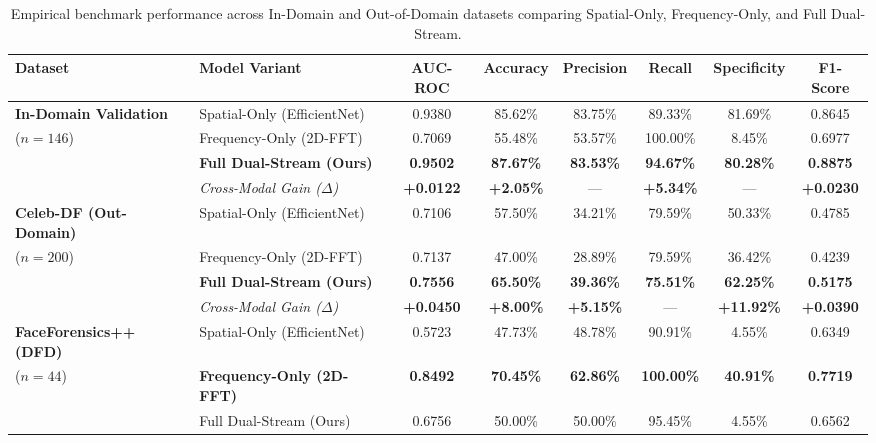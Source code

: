 \documentclass[journal,10pt,twocolumn]{article}
\begin{document}
\begin{table}[t]
\centering
\caption{Empirical benchmark performance across In-Domain and Out-of-Domain datasets comparing Spatial-Only, Frequency-Only, and Full Dual-Stream.}
\label{tab:ablation}
\small
\begin{tabular}{llcccccc}
\toprule
\textbf{Dataset} & \textbf{Model Variant} & \textbf{AUC-ROC} & \textbf{Accuracy} & \textbf{Precision} & \textbf{Recall} & \textbf{Specificity} & \textbf{F1-Score} \\
\midrule
\textbf{In-Domain Validation} & Spatial-Only (EfficientNet) & 0.9380 & 85.62\% & 83.75\% & 89.33\% & 81.69\% & 0.8645 \\
($n=146$)                     & Frequency-Only (2D-FFT)    & 0.7069 & 55.48\% & 53.57\% & 100.00\% & 8.45\% & 0.6977 \\
                              & \textbf{Full Dual-Stream (Ours)} & \textbf{0.9502} & \textbf{87.67\%} & \textbf{83.53\%} & \textbf{94.67\%} & \textbf{80.28\%} & \textbf{0.8875} \\
                              & \textit{Cross-Modal Gain ($\Delta$)} & \textbf{+0.0122} & \textbf{+2.05\%} & --- & \textbf{+5.34\%} & --- & \textbf{+0.0230} \\
\midrule
\textbf{Celeb-DF (Out-Domain)} & Spatial-Only (EfficientNet) & 0.7106 & 57.50\% & 34.21\% & 79.59\% & 50.33\% & 0.4785 \\
($n=200$)                      & Frequency-Only (2D-FFT)    & 0.7137 & 47.00\% & 28.89\% & 79.59\% & 36.42\% & 0.4239 \\
                               & \textbf{Full Dual-Stream (Ours)} & \textbf{0.7556} & \textbf{65.50\%} & \textbf{39.36\%} & \textbf{75.51\%} & \textbf{62.25\%} & \textbf{0.5175} \\
                               & \textit{Cross-Modal Gain ($\Delta$)} & \textbf{+0.0450} & \textbf{+8.00\%} & \textbf{+5.15\%} & --- & \textbf{+11.92\%} & \textbf{+0.0390} \\
\midrule
\textbf{FaceForensics++ (DFD)} & Spatial-Only (EfficientNet) & 0.5723 & 47.73\% & 48.78\% & 90.91\% & 4.55\% & 0.6349 \\
($n=44$)                       & \textbf{Frequency-Only (2D-FFT)} & \textbf{0.8492} & \textbf{70.45\%} & \textbf{62.86\%} & \textbf{100.00\%} & \textbf{40.91\%} & \textbf{0.7719} \\
                               & Full Dual-Stream (Ours)    & 0.6756 & 50.00\% & 50.00\% & 95.45\% & 4.55\% & 0.6562 \\
\bottomrule
\end{tabular}
\end{table}
\end{document}
